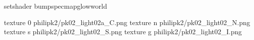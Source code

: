 setshader bumpspecmapglowworld


texture 0 philipk2/pk02_light02a_C.png
texture n philipk2/pk02_light02_N.png
texture s philipk2/pk02_light02_S.png
texture g philipk2/pk02_light02_I.png


